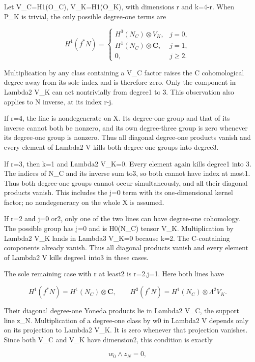 Let V\_C=H1(O\_C), V\_K=H1(O\_K), with dimensions r and k=4-r. When P\_K is
trivial, the only possible degree-one terms are

\[
 H^1(f^*N)=
 \begin{cases}
 H^0(N_C)\otimes V_K,&j=0,\\
 H^1(N_C)\otimes\mathbf C,&j=1,\\
 0,&j\ge2.
 \end{cases}
 \tag{E829.8}
\]

Multiplication by any class containing a V\_C factor raises the C
cohomological degree away from its sole index and is therefore zero. Only
the component in Lambda2 V\_K can act nontrivially from degree1 to 3. This
observation also applies to N inverse, at its index r-j.

If r=4, the line is nondegenerate on X. Its degree-one group and that of its
inverse cannot both be nonzero, and its own degree-three group is zero
whenever its degree-one group is nonzero. Thus all diagonal degree-one
products vanish and every element of Lambda2 V kills both degree-one groups
into degree3.

If r=3, then k=1 and Lambda2 V\_K=0. Every element again kills degree1 into
3. The indices of N\_C and its inverse sum to3, so both cannot have index at
most1. Thus both degree-one groups cannot occur simultaneously, and all
their diagonal products vanish. This includes the j=0 term with its
one-dimensional kernel factor; no nondegeneracy on the whole X is assumed.

If r=2 and j=0 or2, only one of the two lines can have degree-one
cohomology. The possible group has j=0 and is H0(N\_C) tensor V\_K.
Multiplication by Lambda2 V\_K lands in Lambda3 V\_K=0 because k=2. The
C-containing components already vanish. Thus all diagonal products vanish
and every element of Lambda2 V kills degree1 into3 in these cases.

The sole remaining case with r at least2 is r=2,j=1. Here both lines have

\[
 H^1(f^*N)=H^1(N_C)\otimes\mathbf C,
 \qquad
 H^3(f^*N)=H^1(N_C)\otimes\Lambda^2V_K.
 \tag{E829.9}
\]

Their diagonal degree-one Yoneda products lie in Lambda2 V\_C, the support
line z\_N. Multiplication of a degree-one class by w0 in Lambda2 V depends
only on its projection to Lambda2 V\_K. It is zero whenever that projection
vanishes. Since both V\_C and V\_K have dimension2, this condition is
exactly

\[
 w_0\wedge z_N=0,
 \tag{E829.10}
\]

